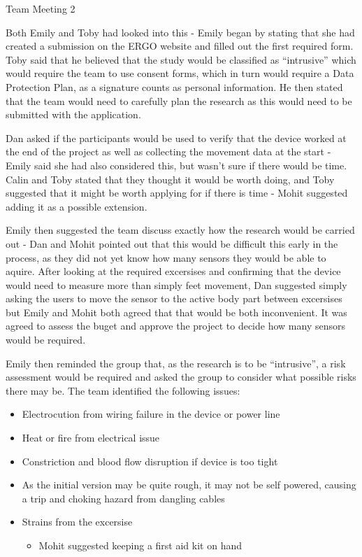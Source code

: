 \documentclass{article}
\begin{document}
\begin{Minutes}{Team Meeting 2}

Both Emily and Toby had looked into this - Emily began by stating that she had created a submission on
the ERGO website and filled out the first required form. Toby said that he believed that the study
would be classified as ``intrusive'' which would require the team to use consent forms, which in turn
would require a Data Protection Plan, as a signature counts as personal information. He then stated that
the team would need to carefully plan the research as this would need to be submitted with the application.

Dan asked if the participants would be used to verify that the device worked at the end of the project as
well as collecting the movement data at the start - Emily said she had also considered this, but wasn't
sure if there would be time. Calin and Toby stated that they thought it would be worth doing, and Toby
suggested that it might be worth applying for if there is time - Mohit suggested adding it as a possible
extension.

Emily then suggested the team discuss exactly how the research would be carried out - Dan and Mohit pointed
out that this would be difficult this early in the process, as they did not yet know how many sensors they
would be able to aquire. After looking at the required excersises and confirming that the device would need
to measure more than simply feet movement, Dan suggested simply asking the users to move the sensor to the
active body part between excersises but Emily and Mohit both agreed that that would be both inconvenient. It
was agreed to assess the buget and approve the project to decide how many sensors would be required.

Emily then reminded the group that, as the research is to be ``intrusive'', a risk assessment would be
required and asked the group to consider what possible risks there may be. The team identified the following
issues:

\begin{itemize}
	\item Electrocution from wiring failure in the device or power line
	\item Heat or fire from electrical issue
	\item Constriction and blood flow disruption if device is too tight
	\item As the initial version may be quite rough, it may not be self powered, causing a trip and choking hazard from dangling cables
	\item Strains from the excersise
		\begin{itemize}
			\item Mohit suggested keeping a first aid kit on hand
		\end{itemize}
\end{itemize}


\end{Minutes}
\end{document}
